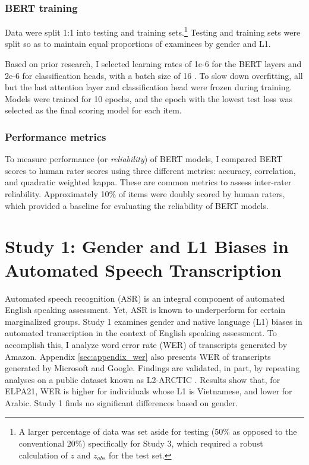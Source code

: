 \documentclass [PhD] {uclathes}
\begin{document}
\subsection{BERT training}
\label{bert_training}

Data were split 1:1 into testing and training sets.\footnote{A larger percentage of data was set aside for testing (50\% as opposed to the conventional 20\%) specifically for Study 3, which required a robust calculation of $z$ and $z_{abs}$ for the test set.} Testing and training sets were split so as to maintain equal proportions of examinees by gender and L1. 

Based on prior research, I selected learning rates of 1e-6 for the BERT layers and 2e-6 for classification heads, with a batch size of 16 \citep{kwako2022using}. To slow down overfitting, all but the last attention layer and classification head were frozen during training. Models were trained for 10 epochs, and the epoch with the lowest test loss was selected as the final scoring model for each item. 

\subsection{Performance metrics}

To measure performance (or \emph{reliability}) of BERT models, I compared BERT scores to human rater scores using three different metrics: accuracy, correlation, and quadratic weighted kappa. These are common metrics to assess inter-rater reliability. Approximately 10\% of items were doubly scored by human raters, which provided a baseline for evaluating the reliability of BERT models.



\chapter{Study 1: Gender and L1 Biases in Automated Speech Transcription}
\label{study1}

Automated speech recognition (ASR) is an integral component of automated English speaking assessment. Yet, ASR is known to underperform for certain marginalized groups. Study 1 examines gender and native language (L1) biases in automated transcription in the context of English speaking assessment. To accomplish this, I analyze word error rate (WER) of transcripts generated by Amazon. Appendix \ref{sec:appendix_wer} also presents WER of transcripts generated by Microsoft and Google. Findings are validated, in part, by repeating analyses on a public dataset known as L2-ARCTIC \citep{zhao2018l2}. Results show that, for ELPA21, WER is higher for individuals whose L1 is Vietnamese, and lower for Arabic. Study 1 finds no significant differences based on gender.
\end{document}
